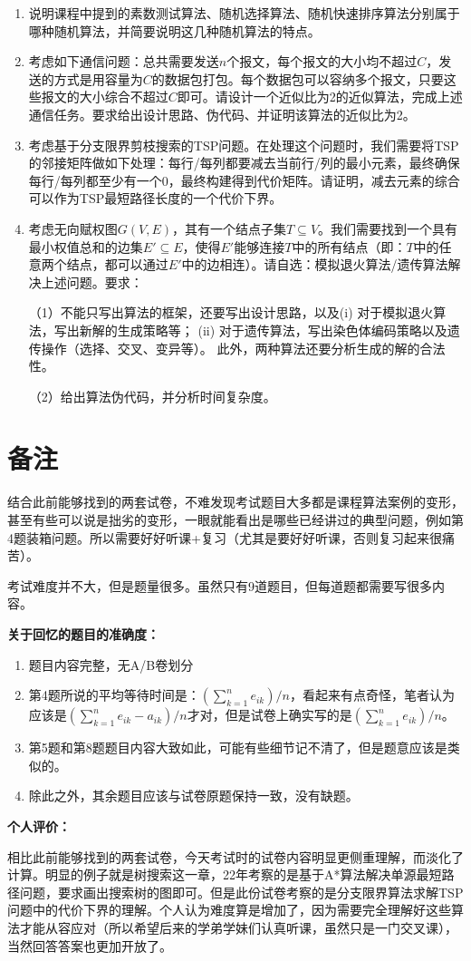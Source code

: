 \documentclass[UTF8,12pt,a4paper]{ctexart}
\begin{document}
\begin{enumerate}[label=\textbf{\arabic*.}, itemsep=\baselineskip]
	（2）给出伪代码，并分析复杂度。

	\item 说明课程中提到的素数测试算法、随机选择算法、随机快速排序算法分别属于哪种随机算法，并简要说明这几种随机算法的特点。
	
	\item 考虑如下通信问题：总共需要发送$n$个报文，每个报文的大小均不超过$C$，发送的方式是用容量为$C$的数据包打包。每个数据包可以容纳多个报文，只要这些报文的大小综合不超过$C$即可。请设计一个近似比为2的近似算法，完成上述通信任务。要求给出设计思路、伪代码、并证明该算法的近似比为2。

	\item 考虑基于分支限界剪枝搜索的TSP问题。在处理这个问题时，我们需要将TSP的邻接矩阵做如下处理：每行/每列都要减去当前行/列的最小元素，最终确保每行/每列都至少有一个0，最终构建得到代价矩阵。请证明，减去元素的综合可以作为TSP最短路径长度的一个代价下界。

	\item 考虑无向赋权图$G(V, E)$，其有一个结点子集$T \subseteq V$。我们需要找到一个具有最小权值总和的边集$E' \subseteq E$，使得$E'$能够连接$T$中的所有结点（即：$T$中的任意两个结点，都可以通过$E'$中的边相连）。请自选：模拟退火算法/遗传算法解决上述问题。要求：
	
	（1）不能只写出算法的框架，还要写出设计思路，以及(i) 对于模拟退火算法，写出新解的生成策略等； (ii) 对于遗传算法，写出染色体编码策略以及遗传操作（选择、交叉、变异等）。 此外，两种算法还要分析生成的解的合法性。
	
	（2）给出算法伪代码，并分析时间复杂度。

\end{enumerate}


\section{备注}

结合此前能够找到的两套试卷，不难发现考试题目大多都是课程算法案例的变形，甚至有些可以说是拙劣的变形，一眼就能看出是哪些已经讲过的典型问题，例如第4题装箱问题。所以需要好好听课+复习（尤其是要好好听课，否则复习起来很痛苦）。

考试难度并不大，但是题量很多。虽然只有9道题目，但每道题都需要写很多内容。

\textbf{关于回忆的题目的准确度：}

\begin{enumerate}
	\item 题目内容完整，无A/B卷划分
	\item 第4题所说的平均等待时间是：$(\sum_{k=1}^{n}{e_{ik}}) / n$，看起来有点奇怪，笔者认为应该是$(\sum_{k=1}^{n}{e_{ik}-a_{ik}}) / n$才对，但是试卷上确实写的是$(\sum_{k=1}^{n}{e_{ik}}) / n$。
	\item 第5题和第8题题目内容大致如此，可能有些细节记不清了，但是题意应该是类似的。
	\item 除此之外，其余题目应该与试卷原题保持一致，没有缺题。
\end{enumerate}

\textbf{个人评价：}

相比此前能够找到的两套试卷，今天考试时的试卷内容明显更侧重理解，而淡化了计算。明显的例子就是树搜索这一章，22年考察的是基于A*算法解决单源最短路径问题，要求画出搜索树的图即可。但是此份试卷考察的是分支限界算法求解TSP问题中的代价下界的理解。个人认为难度算是增加了，因为需要完全理解好这些算法才能从容应对（所以希望后来的学弟学妹们认真听课，虽然只是一门交叉课），当然回答答案也更加开放了。
\end{document}
